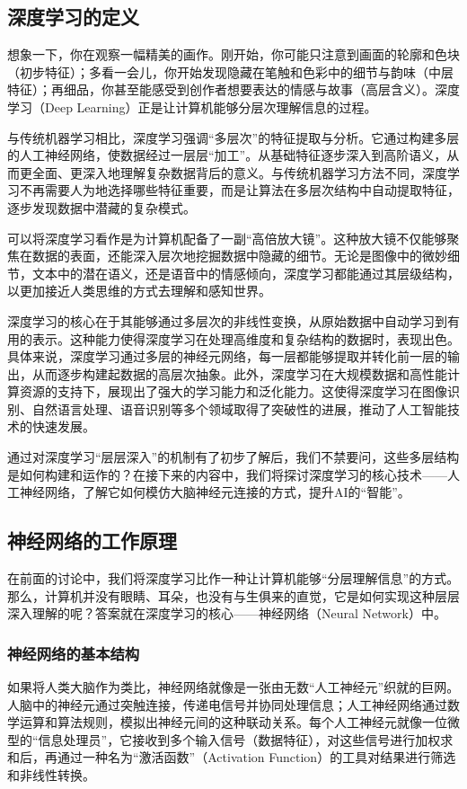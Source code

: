 \subsection{深度学习的定义}
想象一下，你在观察一幅精美的画作。刚开始，你可能只注意到画面的轮廓和色块（初步特征）；多看一会儿，你开始发现隐藏在笔触和色彩中的细节与韵味（中层特征）；再细品，你甚至能感受到创作者想要表达的情感与故事（高层含义）。深度学习（Deep Learning）正是让计算机能够分层次理解信息的过程。

与传统机器学习相比，深度学习强调“多层次”的特征提取与分析。它通过构建多层的人工神经网络，使数据经过一层层“加工”。从基础特征逐步深入到高阶语义，从而更全面、更深入地理解复杂数据背后的意义。与传统机器学习方法不同，深度学习不再需要人为地选择哪些特征重要，而是让算法在多层次结构中自动提取特征，逐步发现数据中潜藏的复杂模式。

可以将深度学习看作是为计算机配备了一副“高倍放大镜”。这种放大镜不仅能够聚焦在数据的表面，还能深入层次地挖掘数据中隐藏的细节。无论是图像中的微妙细节，文本中的潜在语义，还是语音中的情感倾向，深度学习都能通过其层级结构，以更加接近人类思维的方式去理解和感知世界。

深度学习的核心在于其能够通过多层次的非线性变换，从原始数据中自动学习到有用的表示。这种能力使得深度学习在处理高维度和复杂结构的数据时，表现出色。具体来说，深度学习通过多层的神经元网络，每一层都能够提取并转化前一层的输出，从而逐步构建起数据的高层次抽象。此外，深度学习在大规模数据和高性能计算资源的支持下，展现出了强大的学习能力和泛化能力。这使得深度学习在图像识别、自然语言处理、语音识别等多个领域取得了突破性的进展，推动了人工智能技术的快速发展。

通过对深度学习“层层深入”的机制有了初步了解后，我们不禁要问，这些多层结构是如何构建和运作的？在接下来的内容中，我们将探讨深度学习的核心技术——人工神经网络，了解它如何模仿大脑神经元连接的方式，提升AI的“智能”。

\subsection{神经网络的工作原理}

在前面的讨论中，我们将深度学习比作一种让计算机能够“分层理解信息”的方式。那么，计算机并没有眼睛、耳朵，也没有与生俱来的直觉，它是如何实现这种层层深入理解的呢？答案就在深度学习的核心——神经网络（Neural Network）中。

\subsubsection{神经网络的基本结构} 如果将人类大脑作为类比，神经网络就像是一张由无数“人工神经元”织就的巨网。人脑中的神经元通过突触连接，传递电信号并协同处理信息；人工神经网络通过数学运算和算法规则，模拟出神经元间的这种联动关系。每个人工神经元就像一位微型的“信息处理员”，它接收到多个输入信号（数据特征），对这些信号进行加权求和后，再通过一种名为“激活函数”（Activation Function）的工具对结果进行筛选和非线性转换。

